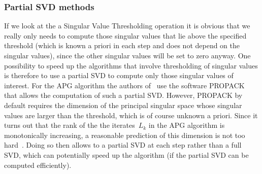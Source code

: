 \documentclass{../../common/projectreport}
\begin{document}
\subsubsection{Partial SVD methods}
\label{Algorithms:Discussion:SVD:PartialSVD:Subsubsec}

If we look at the a Singular Value Thresholding operation it is obvious that we really only needs to compute those singular values that lie above the specified threshold (which is known a priori in each step and does not depend on the singular values), since the other singular values will be set to zero anyway. One possibility to speed up the algorithms that involve thresholding of singular values is therefore to use a partial SVD to compute only those singular values of interest. For the APG algorithm the authors of~\cite{Lin:2010fk} use the software PROPACK that allows the computation of such a partial SVD. However, PROPACK by default requires the dimension of the principal singular space whose singular values are larger than the threshold, which is of course unknown a priori. Since it turns out that the rank of the the iterates~$L_k$ in the APG algorithm is monotonically increasing, a reasonable prediction of this dimension is not too hard~\cite{Lin:2010fk}. Doing so then allows to a partial SVD at each step rather than a full SVD, which can potentially speed up the algorithm (if the partial SVD can be computed efficiently). 
\end{document}
